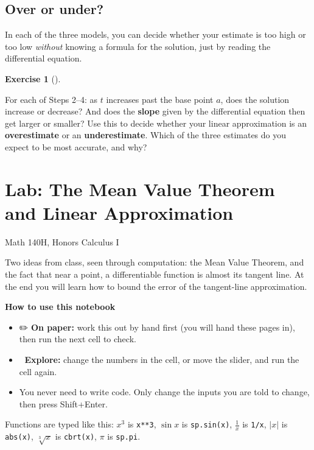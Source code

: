 \documentclass[
  letterpaper,
  DIV=11,
  numbers=noendperiod]{scrreprt}
\providecommand{\tightlist}{%
  \setlength{\itemsep}{0pt}\setlength{\parskip}{0pt}}
\theoremstyle{plain}
\theoremstyle{plain}
\theoremstyle{definition}
\theoremstyle{definition}
\newtheorem{exercise}{Exercise}[chapter]
\theoremstyle{definition}
\theoremstyle{plain}
\theoremstyle{plain}
\theoremstyle{remark}
\begin{document}
\section{Over or under?}\label{over-or-under}

In each of the three models, you can decide whether your estimate is too
high or too low \emph{without} knowing a formula for the solution, just
by reading the differential equation.

\begin{exercise}[]\protect\hypertarget{exr-activity-over-under}{}\label{exr-activity-over-under}

For each of Steps 2--4: as \(t\) increases past the base point \(a\),
does the solution increase or decrease? And does the \textbf{slope}
given by the differential equation then get larger or smaller? Use this
to decide whether your linear approximation is an \textbf{overestimate}
or an \textbf{underestimate}. Which of the three estimates do you expect
to be most accurate, and why?

\end{exercise}

\chapter{Lab: The Mean Value Theorem and Linear
Approximation}\label{lab-the-mean-value-theorem-and-linear-approximation}

Math 140H, Honors Calculus I

Two ideas from class, seen through computation: the Mean Value Theorem,
and the fact that near a point, a differentiable function is almost its
tangent line. At the end you will learn how to bound the error of the
tangent-line approximation.

\textbf{How to use this notebook}

\begin{itemize}
\tightlist
\item
  ✏️ \textbf{On paper:} work this out by hand first (you will hand these
  pages in), then run the next cell to check.
\item
  🔬 \textbf{Explore:} change the numbers in the cell, or move the
  slider, and run the cell again.
\item
  You never need to write code. Only change the inputs you are told to
  change, then press Shift+Enter.
\end{itemize}

Functions are typed like this: \(x^3\) is \texttt{x**3}, \(\sin x\) is
\texttt{sp.sin(x)}, \(\frac1x\) is \texttt{1/x}, \(\lvert x\rvert\) is
\texttt{abs(x)}, \(\sqrt[3]{x}\) is \texttt{cbrt(x)}, \(\pi\) is
\texttt{sp.pi}.
\end{document}
